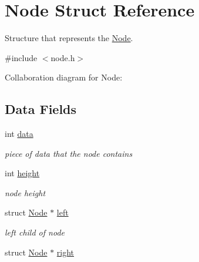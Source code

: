 \hypertarget{structNode}{}\section{Node Struct Reference}
\label{structNode}


Structure that represents the \hyperlink{structNode}{Node}.  




{\ttfamily \#include $<$node.\+h$>$}



Collaboration diagram for Node\+:
\subsection*{Data Fields}
\begin{DoxyCompactItemize}
\item 
int \hyperlink{structNode_a87c003c9f600e3fc58e6e90835f0b605}{data}\hypertarget{structNode_a87c003c9f600e3fc58e6e90835f0b605}{}\label{structNode_a87c003c9f600e3fc58e6e90835f0b605}

\begin{DoxyCompactList}\small\item\em piece of data that the node contains \end{DoxyCompactList}\item 
int \hyperlink{structNode_a61966b207f0584aaa4773e5e1266e905}{height}\hypertarget{structNode_a61966b207f0584aaa4773e5e1266e905}{}\label{structNode_a61966b207f0584aaa4773e5e1266e905}

\begin{DoxyCompactList}\small\item\em node height \end{DoxyCompactList}\item 
struct \hyperlink{structNode}{Node} $\ast$ \hyperlink{structNode_ad0976834843c7618677d22a10c495b36}{left}\hypertarget{structNode_ad0976834843c7618677d22a10c495b36}{}\label{structNode_ad0976834843c7618677d22a10c495b36}

\begin{DoxyCompactList}\small\item\em left child of node \end{DoxyCompactList}\item 
struct \hyperlink{structNode}{Node} $\ast$ \hyperlink{structNode_af99e7102380da88d7c079fa264230cf4}{right}\hypertarget{structNode_af99e7102380da88d7c079fa264230cf4}{}\label{structNode_af99e7102380da88d7c079fa264230cf4}


\end{DoxyCompactItemize}
